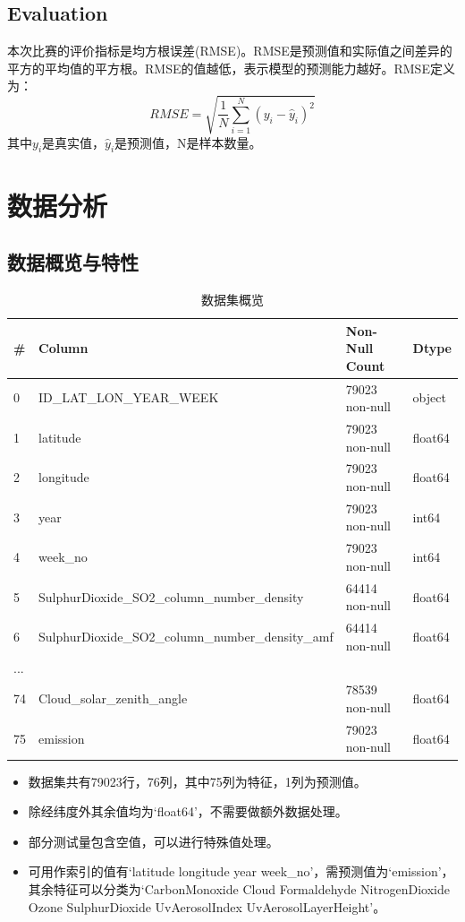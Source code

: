 \documentclass[fontset=windows]{article}
\begin{document}
\subsection{Evaluation}

本次比赛的评价指标是均方根误差(RMSE)。RMSE是预测值和实际值之间差异的平方的平均值的平方根。RMSE的值越低，表示模型的预测能力越好。RMSE定义为：$$RMSE=\sqrt{\frac{1}{N}\sum\limits_{i=1}^{N}(y_i-\hat y_i)^2}$$其中$y_i$是真实值，$\hat y_i$是预测值，N是样本数量。

\section{数据分析}

\subsection{数据概览与特性}

\begin{table}[h]
      \centering
      \begin{tabular}{|l|l|l|l|}
      \hline
          \# & Column & Non-Null Count & Dtype \\ \hline
          0 & ID\_LAT\_LON\_YEAR\_WEEK & 79023 non-null & object \\ \hline
          1 & latitude & 79023 non-null & float64 \\ \hline
          2 & longitude & 79023 non-null & float64 \\ \hline
          3 & year & 79023 non-null & int64 \\ \hline
          4 & week\_no & 79023 non-null & int64 \\ \hline
          5 & SulphurDioxide\_SO2\_column\_number\_density & 64414 non-null & float64 \\ \hline
          6 & SulphurDioxide\_SO2\_column\_number\_density\_amf & 64414 non-null & float64 \\ \hline
          ... & ~ & ~ & ~ \\ \hline
          74 & Cloud\_solar\_zenith\_angle & 78539 non-null & float64 \\ \hline
          75 & emission & 79023 non-null & float64 \\ \hline
      \end{tabular}
      \caption{数据集概览}
\end{table}

\begin{itemize}
      \item 数据集共有79023行，76列，其中75列为特征，1列为预测值。
      \item 除经纬度外其余值均为`float64'，不需要做额外数据处理。
      \item 部分测试量包含空值，可以进行特殊值处理。
      \item 可用作索引的值有`latitude longitude year week\_no'，需预测值为`emission'，其余特征可以分类为`CarbonMonoxide Cloud Formaldehyde NitrogenDioxide Ozone SulphurDioxide UvAerosolIndex UvAerosolLayerHeight'。
\end{itemize}
\end{document}
